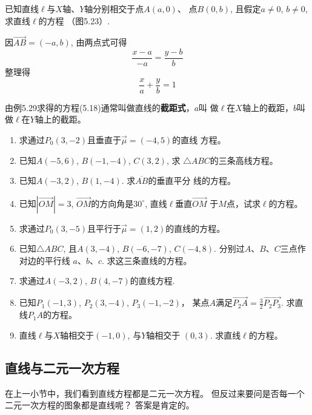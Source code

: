 \begin{example}
    已知直线$\ell$与$X$轴、$Y$轴分别相交于点$A(a,0)$、
点$B(0,b)$, 且假定$a\ne 0$, $b\ne 0$, 求直线$\ell$的方程
（图5.23）.
\end{example}

\begin{solution}
    因$\Vec{AB}=(-a,b)$, 由两点式可得
\[\frac{x-a}{-a}=\frac{y-b}{b}\]
整理得
\begin{equation}
    \frac{x}{a}+\frac{y}{b}=1
\end{equation}
\end{solution}

由例5.29求得的方程(5.18)通常叫做直线的\textbf{截距式}，$a$叫
做$\ell$在$X$轴上的截距，$b$叫做$\ell$在$Y$轴上的截距。

\begin{ex}
\begin{enumerate}
    \item 求通过$P_0(3,-2)$且垂直于$\vec{\mu}=(-4,5)$的直线
    方程。
    \item 已知$A(-5,6)$, $B(-1,-4)$, $C(3,2)$, 求
    $\triangle ABC$的三条高线方程。
    \item 已知$A(-3,2)$, $B(1,-4)$. 求$\overline{AB}$的垂直平分
    线的方程。
    \item 已知$|\Vec{OM}|=3$, $\Vec{OM}$的方向角是$30^{\circ}$, 直线$\ell$垂直$\Vec{OM}$
    于$M$点，试求$\ell$的方程。
    \item 求通过$P_0(3,-5)$且平行于$\vec{\mu}=(1,2)$的直线的方程。
    \item 已知$\triangle ABC$, 且$A(3,-4)$, $B(-6,-7)$, 
    $C(-4,8)$. 分别过$A$、$B$、$C$三点作对边的平行线
    $a$、$b$、$c$. 求这三条直线的方程。
    \item 求通过$A(-3,2)$, $B(4,-7)$的直线方程.
    \item 已知$P_1(-1,3)$, $P_2(3,-4)$, $P_3(-1,-2)$，
    某点$A$满足$\Vec{P_2A}=\frac{3}{2}\Vec{P_2P_3}$. 求直线$P_1A$的方程。 
    \item 直线$\ell$与$X$轴相交于$(-1,0)$, 与$Y$轴相交于
    $(0,3)$. 求直线$\ell$的方程。
\end{enumerate}
\end{ex}

\subsection{直线与二元一次方程}
在上一小节中，我们看到直线方程都是二元一次方程。
但反过来要问是否每一个二元一次方程的图象都是直线呢？
答案是肯定的。

